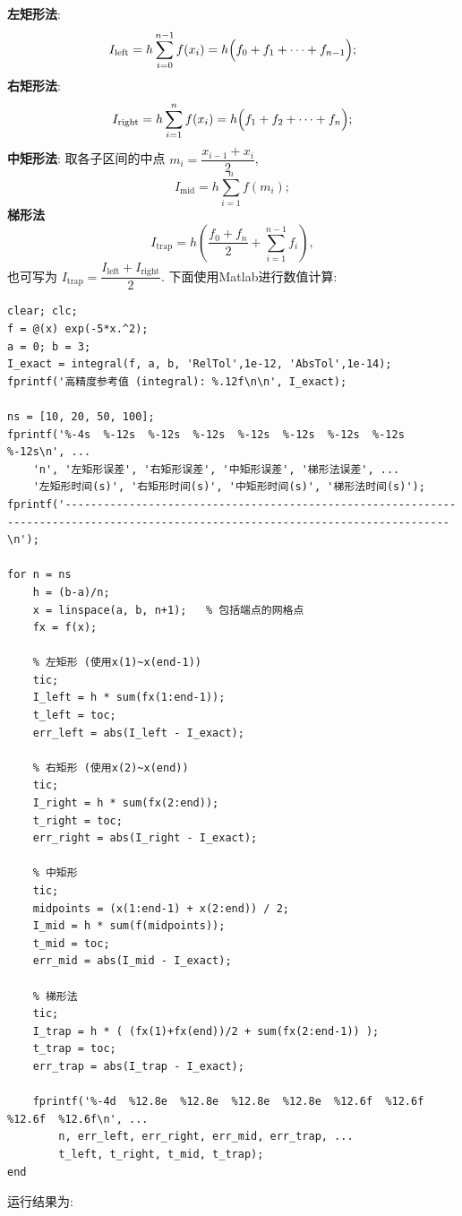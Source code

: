 \documentclass[12pt,a4paper]{ctexart}
\begin{document}
\textbf{左矩形法}:
\[
I_{\text{left}} = h \sum_{i=0}^{n-1} f(x_i) = h\Bigl( f_0 + f_1 + \cdots + f_{n-1} \Bigr);
\]
\textbf{右矩形法}:
\[
I_{\text{right}} = h \sum_{i=1}^{n} f(x_i) = h\Bigl( f_1 + f_2 + \cdots + f_n \Bigr);
\]
\textbf{中矩形法}: 取各子区间的中点 $m_i = \dfrac{x_{i-1} + x_i}{2}$, 
\[
I_{\text{mid}} = h \sum_{i=1}^{n} f(m_i);
\]
\textbf{梯形法}
\[
I_{\text{trap}} = h\left( \frac{f_0 + f_n}{2} + \sum_{i=1}^{n-1} f_i \right),
\]
也可写为 $I_{\text{trap}} = \dfrac{I_{\text{left}} + I_{\text{right}}}{2}$. 下面使用Matlab进行数值计算:
\vspace{0.5cm}
\begin{lstlisting}[caption={矩形法与梯形法}]
clear; clc;
f = @(x) exp(-5*x.^2);
a = 0; b = 3;
I_exact = integral(f, a, b, 'RelTol',1e-12, 'AbsTol',1e-14);
fprintf('高精度参考值 (integral): %.12f\n\n', I_exact);

ns = [10, 20, 50, 100];
fprintf('%-4s  %-12s  %-12s  %-12s  %-12s  %-12s  %-12s  %-12s  %-12s\n', ...
    'n', '左矩形误差', '右矩形误差', '中矩形误差', '梯形法误差', ...
    '左矩形时间(s)', '右矩形时间(s)', '中矩形时间(s)', '梯形法时间(s)');
fprintf('----------------------------------------------------------------------------------------------------------------------------------\n');

for n = ns
    h = (b-a)/n;
    x = linspace(a, b, n+1);   % 包括端点的网格点
    fx = f(x);
    
    % 左矩形 (使用x(1)~x(end-1))
    tic;
    I_left = h * sum(fx(1:end-1));
    t_left = toc;
    err_left = abs(I_left - I_exact);
    
    % 右矩形 (使用x(2)~x(end))
    tic;
    I_right = h * sum(fx(2:end));
    t_right = toc;
    err_right = abs(I_right - I_exact);
    
    % 中矩形
    tic;
    midpoints = (x(1:end-1) + x(2:end)) / 2;
    I_mid = h * sum(f(midpoints));
    t_mid = toc;
    err_mid = abs(I_mid - I_exact);
    
    % 梯形法
    tic;
    I_trap = h * ( (fx(1)+fx(end))/2 + sum(fx(2:end-1)) );
    t_trap = toc;
    err_trap = abs(I_trap - I_exact);
    
    fprintf('%-4d  %12.8e  %12.8e  %12.8e  %12.8e  %12.6f  %12.6f  %12.6f  %12.6f\n', ...
        n, err_left, err_right, err_mid, err_trap, ...
        t_left, t_right, t_mid, t_trap);
end
\end{lstlisting}
运行结果为:
\end{document}
